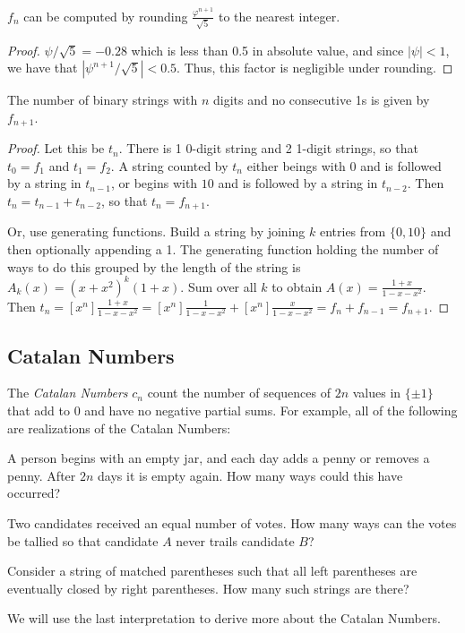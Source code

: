 \documentclass[a4paper]{article}
\begin{document}
\begin{corollary}
$f_n$ can be computed by rounding $\frac{\varphi^{n+1}}{\sqrt 5}$ to the nearest integer.

\begin{hl}
\begin{proof}
$\psi/\sqrt5=-0.28$ which is less than 0.5 in absolute value, and since $|\psi|<1$, we have that $|\psi^{n+1}/\sqrt5|<0.5$. Thus, this factor is negligible under rounding.
\end{proof}
\end{hl}
\end{corollary}

\begin{example}
The number of binary strings with $n$ digits and no consecutive 1s is given by $f_{n+1}$.

\begin{hl}
\begin{proof}
Let this be $t_n$. There is 1 0-digit string and 2 1-digit strings, so that $t_0=f_1$ and $t_1=f_2$. A string counted by $t_n$ either beings with $0$ and is followed by a string in $t_{n-1}$, or begins with $10$ and is followed by a string in $t_{n-2}$. Then $t_n=t_{n-1}+t_{n-2}$, so that $t_n=f_{n+1}$.

\medskip

Or, use generating functions. Build a string by joining $k$ entries from $\{0,10\}$ and then optionally appending a 1. The generating function holding the number of ways to do this grouped by the length of the string is $A_k(x)=(x+x^2)^k(1+x)$. Sum over all $k$ to obtain $A(x)=\frac{1+x}{1-x-x^2}$. Then $t_n=[x^n]\frac{1+x}{1-x-x^2}=[x^n]\frac1{1-x-x^2}+[x^n]\frac x{1-x-x^2}=f_n+f_{n-1}=f_{n+1}$.
\end{proof}
\end{hl}
\end{example}

\subsection{Catalan Numbers}

\begin{definition}
The \emph{Catalan Numbers} $c_n$ count the number of sequences of $2n$ values in $\{\pm1\}$ that add to $0$ and have no negative partial sums. For example, all of the following are realizations of the Catalan Numbers:
\begin{arrows}
\item A person begins with an empty jar, and each day adds a penny or removes a penny. After $2n$ days it is empty again. How many ways could this have occurred?
\item Two candidates received an equal number of votes. How many ways can the votes be tallied so that candidate $A$ never trails candidate $B$?
\item Consider a string of matched parentheses such that all left parentheses are eventually closed by right parentheses. How many such strings are there?
\end{arrows}
We will use the last interpretation to derive more about the Catalan Numbers.
\end{definition}
\end{document}
